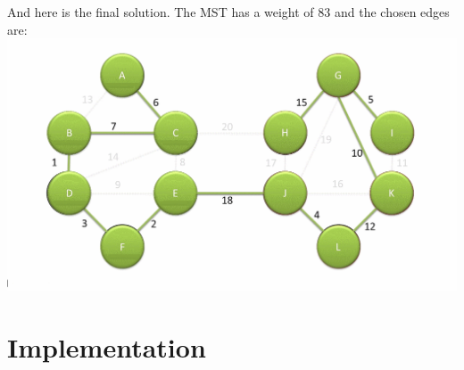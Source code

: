 \documentclass[
	11pt, %
]{beamer}
\begin{document}
\begin{frame}
    And here is the final solution. The MST has a weight of 83 and the chosen edges are:
    \includegraphics[width = 1\textwidth]{baruvka-example/frame_33_delay-4s.png}
\end{frame}

\section{Implementation}
\begin{frame}
    \tableofcontentscurrent
\end{frame}
\end{document}
